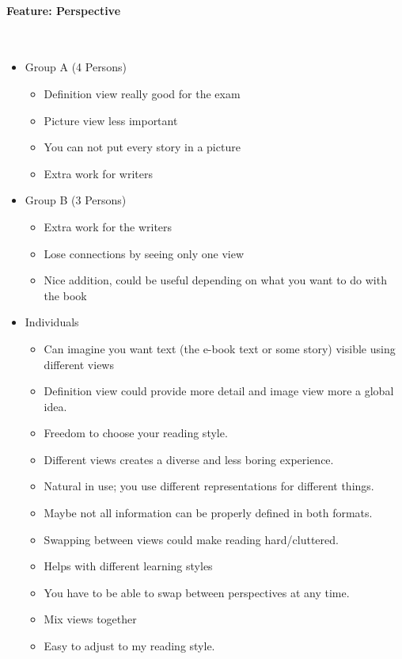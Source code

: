\documentclass[main.tex]{subfiles}
\begin{document}
\paragraph{Feature: Perspective}~
\begin{itemize}
	\item Group A (4 Persons)
		\begin{itemize}
			\item Definition view really good for the exam
			\item Picture view less important
			\item You can not put every story in a picture
			\item Extra work for writers
		\end{itemize}
	\item Group B (3 Persons)
		\begin{itemize}
			\item Extra work for the writers
			\item Lose connections by seeing only one view
			\item Nice addition, could be useful depending on what you want to do with the book
		\end{itemize}
	\item Individuals
		\begin{itemize}
      \item Can imagine you want text (the e-book text or some story) visible using different views %
			\item Definition view could provide more detail and image view more a global idea.
			\item Freedom to choose your reading style.
			\item Different views creates a diverse and less boring experience.
			\item Natural in use; you use different representations for different things.
			\item Maybe not all information can be properly defined in both formats.
			\item Swapping between views could make reading hard/cluttered.
			\item Helps with different learning styles
			\item You have to be able to swap between perspectives at any time. 
			\item Mix views together
			\item Easy to adjust to my reading style.
		\end{itemize}
\end{itemize}
\end{document}
